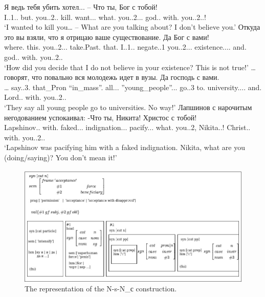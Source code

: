 \documentclass[output=paper]{langscibook}
\begin{document}
\ea
\ea
\gll Я ведь тебя убить хотел... – Что ты, Бог с тобой!\\
     I.{\PRON}.1.{\NOM}.{\SG} but.{\PTCP} you.{\PRON}.2.{\ACC}.{\SG} kill.{\INF} want.{\PAST}.{\glossM}{\SG}. what.{\PRON} you.{\PRON}.2.{\NOM}.{\SG}. god.{\NOUN}.{\NOM} with.{\PREP} you.{\PRON}.2.{\INSTR}.{\SG}!\\
\glt `I wanted to kill you… – What are you talking about? I don’t believe you.'
\ex
\gll Откуда это вы взяли, что я отрицаю ваше существование. Да Бог с вами!\\
     where.{\PRON} this.{\PRON} you.{\PRON}.2.{\NOM}.{\PL}. take.Past.{\PL} that.{\PRON} I.{\PRON}.1.{\NOM}.{\SG} negate.{\PRES}.1{\SG} you.{\PRON}.2.{\POSS}.{\ACC}.{\SG} existence.{\NOUN}.{\ACC}.{\SG}. and.{\PTCP} god.{\NOUN}.{\NOM} with.{\PREP} you.{\PRON}.2.{\INSTR}.{\PL}\\
\glt `How did you decide that I do not believe in your existence? This is not true!'
\ex
\gll … говорят, что повально вся молодежь идет в вузы. Да господь с вами.\\
     … say.{\PRES}.3.{\PL} that\_Pron “in\_mass”.{\ADV} all.{\PRON}{\F}.{\NOM}.{\SG} ”young\_people”.{\NOUN}.{\NOM}.{\SG} go.{\PRES}.3{\SG} to.{\PREP} university.{\NOUN}.{\ACC}.{\PL}. and.{\PTCP} Lord.{\NOUN}.{\NOM} with.{\PREP} you.{\PRON}.2.{\INSTR}.{\PL}\\
\glt `They say all young people go to universities. No way!'
\ex
\gll Лапшинов с нарочитым негодованием успокаивал: -Что ты, Никита! Христос с тобой!\\
     Lapshinov.{\NOUNPROPER}.{\NOM} with.{\PREP} faked.{\ADJ}.{\INSTR}.{\SG} indignation.{\NOUN}.{\INSTR}.{\SG} pacify.{\PAST}.{\glossM}{\SG}. what.{\PRON} you.{\PRON}.2{\SG}, Nikita.{\NOUNPROPER}.{\NOM}! Christ.{\NOUN}.{\NOM} with.{\PREP} you.{\PRON}.2.{\INSTR}.{\SG}\\
\glt `Lapshinov was pacifying him with a faked indignation. Nikita, what are you (doing/saying)? You don’t mean it!'
\z
\z


\begin{figure}
\includegraphics[width=\textwidth]{figures/mikhailov-img004.jpg}
\caption{\label{fig:mikhailov:4}The representation of the N-s-N\_{с construction.}}
\end{figure}
\end{document}
